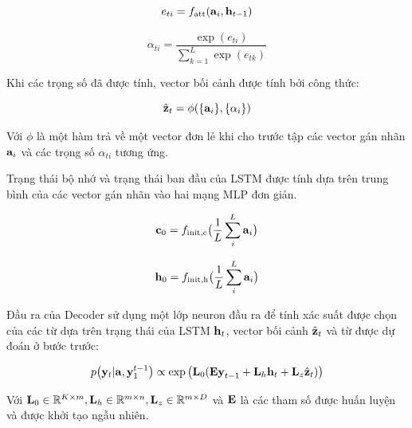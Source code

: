 \documentclass[14pt, a4paper]{article}
\numberwithin{equation}{section}
\numberwithin{algorithm}{section}
\numberwithin{figure}{section}
\numberwithin{table}{section}
\numberwithin{dl}{section}
\numberwithin{md}{section}
\numberwithin{bd}{section}
\numberwithin{dn}{section}
\numberwithin{hq}{section}
\begin{document}
    \begin{equation}
        e_{ti}=f_{\mathrm{att}}(\bold{a}_i, \bold{h}_{t-1})
    \end{equation}

    \begin{equation}
        \alpha_{ti}=\dfrac{\exp(e_{ti})}{\displaystyle\sum_{k=1}^L \exp(e_{tk})}
    \end{equation}

    Khi các trọng số đã được tính, vector bối cảnh được tính bởi công thức:

    \begin{equation}
        \hat{\bold{z}}_t = \phi (\lbrace \bold{a}_i \rbrace, \lbrace \alpha_i \rbrace)
    \end{equation}
    
    Với $\phi$ là một hàm trả về một vector đơn lẻ khi cho trước tập các vector gán nhãn $\bold{a}_i$ và các trọng số $\alpha_{ti}$ tương ứng.

    Trạng thái bộ nhớ và trạng thái ban đầu của LSTM được tính dựa trên trung bình của các vector gán nhãn vào hai mạng MLP đơn giản.

    \begin{equation}
        \bold{c}_0 = f_{\mathrm{init, c}}\big(\dfrac{1}{L}\sum_i^L\bold{a}_i\big)
    \end{equation}

    \begin{equation}
        \bold{h}_0 = f_{\mathrm{init, h}}\big(\dfrac{1}{L}\sum_i^L\bold{a}_i\big)
    \end{equation}

    Đầu ra của Decoder sử dụng một lớp neuron đầu ra để tính xác suất được chọn của các từ dựa trên trạng thái của LSTM $\bold{h}_t$, vector bối cảnh $\hat{\bold{z}}_t$ và từ được dự đoán ở bước trước:

    \begin{equation} \label{eq:Output-Layer}
        p\big(\bold{y}_t\vert \bold{a}, \bold{y}_1^{t-1}\big) \propto \exp\big( \bold{L}_0(\bold{Ey}_{t-1} + \bold{L}_h\bold{h}_t + \bold{L}_z \hat{\bold{z}}_t) \big)
    \end{equation}

    Với $\bold{L}_0 \in \mathbb{R}^{K\times m}, \bold{L}_h \in \mathbb{R}^{m\times n}, \bold{L}_z \in \mathbb{R}^{m\times D}$ và $\bold{E}$ là các tham số được huấn luyện và được khởi tạo ngẫu nhiên.
\end{document}
